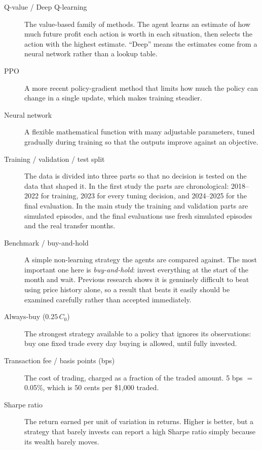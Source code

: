 \begin{description}
  \item[Q-value / Deep Q-learning] The value-based family of methods.
  The agent learns an estimate of how much future profit each action is
  worth in each situation, then selects the action with the highest
  estimate. ``Deep'' means the estimates come from a neural network
  rather than a lookup table.

  \item[PPO] A more recent policy-gradient method that limits how much
  the policy can change in a single update, which makes training
  steadier.

  \item[Neural network] A flexible mathematical function with many
  adjustable parameters, tuned gradually during training so that the
  outputs improve against an objective.

  \item[Training / validation / test split] The data is divided into
  three parts so that no decision is tested on the data that shaped it.
  In the first study the parts are chronological: 2018--2022 for
  training, 2023 for every tuning decision, and 2024--2025 for the final
  evaluation. In the main study the training and validation parts are
  simulated episodes, and the final evaluations use fresh simulated
  episodes and the real transfer months.

  \item[Benchmark / buy-and-hold] A simple non-learning strategy the
  agents are compared against. The most important one here is
  \emph{buy-and-hold}: invest everything at the start of the month and
  wait. Previous research shows it is genuinely difficult to beat using
  price history alone, so a result that beats it easily should be
  examined carefully rather than accepted immediately.

  \item[Always-buy (\(0.25\,C_0\))] The strongest strategy available to
  a policy that ignores its observations: buy one fixed trade every day
  buying is allowed, until fully invested.

  \item[Transaction fee / basis points (bps)] The cost of trading,
  charged as a fraction of the traded amount. 5 bps $=$ 0.05\%, which is
  50 cents per \$1{,}000 traded.

  \item[Sharpe ratio] The return earned per unit of variation in
  returns. Higher is better, but a strategy that barely invests can
  report a high Sharpe ratio simply because its wealth barely moves.


\end{description}

